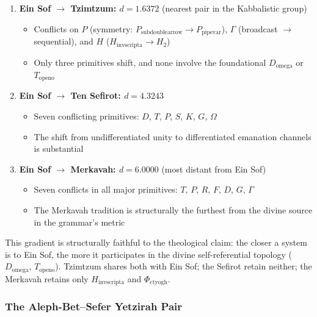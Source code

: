 \documentclass[12pt,a4paper]{article}
\begin{document}
\begin{enumerate}
    \item 
    \textbf{Ein Sof $\rightarrow$ Tzimtzum: $d = 1.6372$} (nearest pair in the Kabbalistic group)

    \begin{itemize}
    \item Conflicts on $P$ (symmetry: $P_{\text{subdoublearrow}} \to P_{\text{pipevar}}$), $\Gamma$ (broadcast $\rightarrow$ sequential), and $H$ ($H_{\text{invscripta}} \to H_2$)
    \item Only three primitives shift, and none involve the foundational $D_{\text{omega}}$ or $T_{\text{openo}}$
\end{itemize}

    \item 
    \textbf{Ein Sof $\rightarrow$ Ten Sefirot: $d = 4.3243$}

    \begin{itemize}
    \item Seven conflicting primitives: $D$, $T$, $P$, $S$, $K$, $G$, $\Omega$
    \item The shift from undifferentiated unity to differentiated emanation channels is substantial
\end{itemize}

    \item 
    \textbf{Ein Sof $\rightarrow$ Merkavah: $d = 6.0000$} (most distant from Ein Sof)

    \begin{itemize}
    \item Seven conflicts in all major primitives: $T$, $P$, $R$, $F$, $D$, $G$, $\Gamma$
    \item The Merkavah tradition is structurally the furthest from the divine source in the grammar's metric
\end{itemize}

\end{enumerate}

This gradient is structurally faithful to the theological claim: the closer a system is to Ein Sof, the more it participates in the divine self-referential topology ($D_{\text{omega}}$, $T_{\text{openo}}$). Tzimtzum shares both with Ein Sof; the Sefirot retain neither; the Merkavah retains only $H_{\text{invscripta}}$ and $\Phi_{\text{ctyogh}}$.

\subsubsection{The Aleph-Bet--Sefer Yetzirah Pair}
\end{document}
